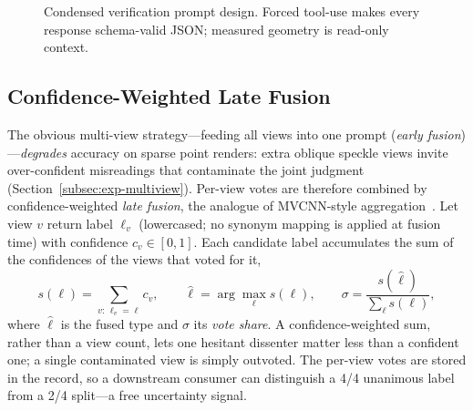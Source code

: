 \begin{figure}[!htb]
\centering
{}
\caption{Condensed verification prompt design. Forced tool-use makes every
response schema-valid JSON; measured geometry is read-only context.}
\label{fig:prompt}
\end{figure}

\subsection{Confidence-Weighted Late Fusion}
\label{subsec:fusion}

The obvious multi-view strategy---feeding all views into one prompt
(\emph{early fusion})---\emph{degrades} accuracy on sparse point renders:
extra oblique speckle views invite over-confident misreadings that contaminate
the joint judgment (Section~\ref{subsec:exp-multiview}). Per-view votes are
therefore combined by confidence-weighted \emph{late fusion}, the analogue of
MVCNN-style aggregation~\cite{su2015mvcnn}. Let view $v$ return label $\ell_v$
(lowercased; no synonym mapping is applied at fusion time) with confidence
$c_v\in[0,1]$. Each candidate label accumulates the sum of the confidences of
the views that voted for it,
\begin{equation}
  s(\ell)=\sum_{v:\,\ell_v=\ell}c_v, \qquad
  \hat{\ell}=\arg\max_{\ell}s(\ell), \qquad
  \sigma=\frac{s(\hat{\ell})}{\sum_{\ell}s(\ell)},
  \label{eq:fusion}
\end{equation}
where $\hat{\ell}$ is the fused type and $\sigma$ its \emph{vote share}. A
confidence-weighted sum, rather than a view count, lets one hesitant dissenter
matter less than a confident one; a single contaminated view is simply outvoted.
The per-view votes are stored in the record, so a downstream consumer can
distinguish a 4/4 unanimous label from a 2/4 split---a free uncertainty
signal.

